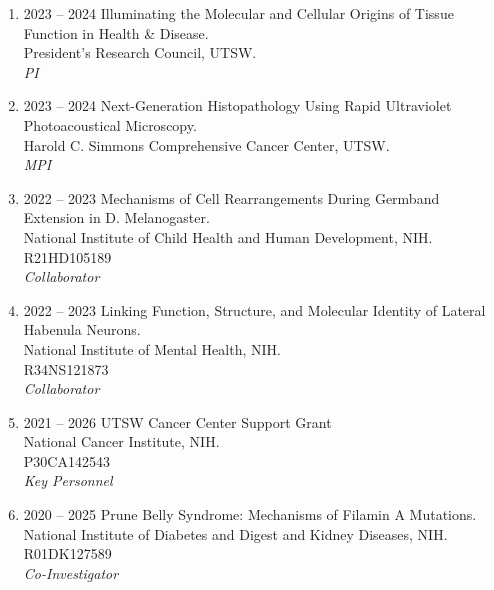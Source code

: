 \begin{enumerate}
[leftmargin=!,
labelindent=0pt,
itemindent=-66pt,
label=\textbullet]

\item 2023 -- 2024 
\hspace{8pt}
Illuminating the Molecular and Cellular Origins of Tissue Function in Health \& Disease.\\
President’s Research Council, UTSW.\\
{\it PI}

\item 2023 -- 2024 
\hspace{8pt}
Next-Generation Histopathology Using Rapid Ultraviolet Photoacoustical Microscopy. \\
Harold C. Simmons Comprehensive Cancer Center, UTSW. \\
{\it MPI}

\item 2022 -- 2023 
\hspace{8pt}
Mechanisms of Cell Rearrangements During Germband Extension in D. Melanogaster.\\
National Institute of Child Health and Human Development, NIH. \\
R21HD105189 \\
{\it Collaborator}

\item 2022 -- 2023 
\hspace{8pt}
Linking Function, Structure, and Molecular Identity of Lateral Habenula Neurons. \\
National Institute of Mental Health, NIH. \\
R34NS121873 \\
{\it Collaborator}

\item 2021 -- 2026 
\hspace{8pt}
UTSW Cancer Center Support Grant \\
National Cancer Institute, NIH. \\
P30CA142543 \\ 
{\it Key Personnel}

\item 2020 -- 2025 
\hspace{8pt} 
Prune Belly Syndrome: Mechanisms of Filamin A Mutations. \\
National Institute of Diabetes and Digest and Kidney Diseases, NIH. \\
R01DK127589 \\
{\it Co-Investigator} 


\end{enumerate}
